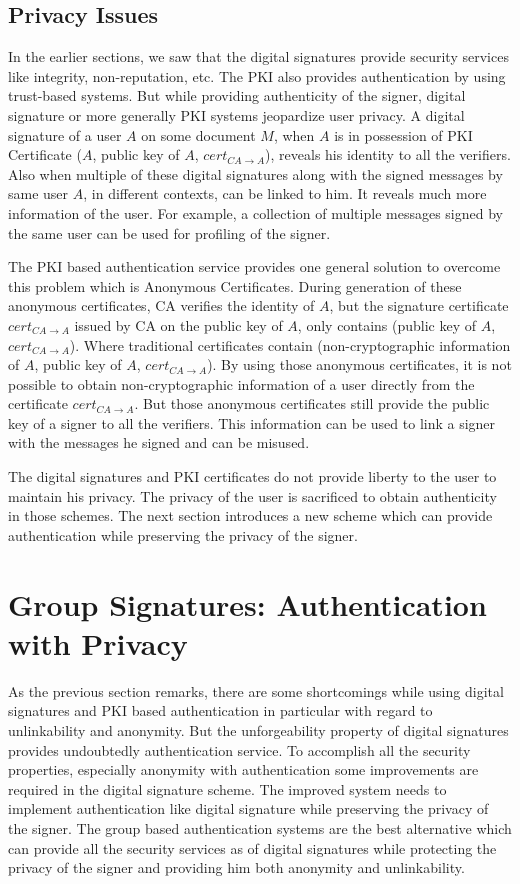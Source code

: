 \subsection{Privacy Issues}
In the earlier sections, we saw that the digital signatures provide security services like integrity, non-reputation, etc. The PKI also provides authentication by using trust-based systems. But while providing authenticity of the signer, digital signature or more generally PKI systems jeopardize user privacy. A digital signature of a user $A$ on some document $M$, when $A$ is in possession of PKI Certificate ($A$, public key of $A$, $cert_{CA \rightarrow A}$), reveals his identity to all the verifiers. Also when multiple of these digital signatures along with the signed messages by same user $A$, in different contexts, can be linked to him. It reveals much more information of the user. For example, a collection of multiple messages signed by the same user can be used for profiling of the signer. 
 
The PKI based authentication service provides one general solution to overcome this problem which is Anonymous Certificates. During generation of these anonymous certificates, CA verifies the identity of $A$, but the signature certificate $cert_{CA \rightarrow A}$ issued by CA on the public key of $A$, only contains (public key of $A$, $cert_{CA \rightarrow A}$). Where traditional certificates contain (non-cryptographic information of $A$, public key of $A$, $cert_{CA \rightarrow A}$). By using those anonymous certificates, it is not possible to obtain non-cryptographic information of a user directly from the certificate $cert_{CA \rightarrow A}$. But those anonymous certificates still provide the public key of a signer to all the verifiers. This information can be used to link a signer with the messages he signed and can be misused. 
 
The digital signatures and PKI certificates do not provide liberty to the user to maintain his privacy. The privacy of the user is sacrificed to obtain authenticity in those schemes. The next section introduces a new scheme which can provide authentication while preserving the privacy of the signer.

\section{Group Signatures: Authentication with Privacy}
As the previous section remarks, there are some shortcomings while using digital signatures and PKI based authentication in particular with regard to unlinkability and anonymity. But the unforgeability property of digital signatures provides undoubtedly authentication service. To accomplish all the security properties, especially anonymity with authentication some improvements are required in the digital signature scheme. The improved system needs to implement authentication like digital signature while preserving the privacy of the signer. The group based authentication systems are the best alternative which can provide all the security services as of digital signatures while protecting the privacy of the signer and providing him both anonymity and unlinkability.
